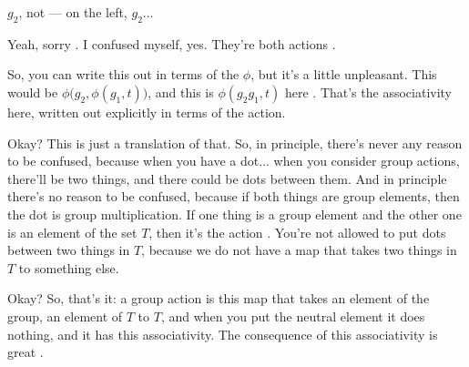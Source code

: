\begin{student}
$g_2$, not --- on the left, $g_2$...
\end{student}

\begin{speech}[00:47:34 - 00:48:58]
Yeah, sorry . I confused myself, yes. They're both actions .

So, you can write this out in terms of the $\phi$, but it's a little unpleasant. This would be $\phi\bigl(g_2, \phi(g_1, t)\bigr)$, and this is $\phi(g_2 g_1, t)$ here . That's the associativity here, written out explicitly in terms of the action.

Okay? This is just a translation of that. So, in principle, there's never any reason to be confused, because when you have a dot... when you consider group actions, there'll be two things, and there could be dots between them. And in principle there's no reason to be confused, because if both things are group elements, then the dot is group multiplication. If one thing is a group element and the other one is an element of the set $T$, then it's the action . You're not allowed to put dots between two things in $T$, because we do not have a map that takes two things in $T$ to something else.

Okay? So, that's it: a group action is this map that takes an element of the group, an element of $T$ to $T$, and when you put the neutral element it does nothing, and it has this associativity. The consequence of this associativity is great .
\end{speech}

